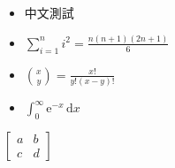 \begin{itemize}

\item 中文測試 

\item $\sum \limits_{i=1}^n i^2 = \frac{n(n+1)(2n+1)}{6}$

\item $ \binom{x}{y} = \frac{x!}{y!(x-y)!}$

\item $ {\int_0^\infty \mathrm{e}^{-x}\,\mathrm{d}x}$

\end{itemize}

\item $ {\begin{bmatrix}a & b \\c & d \end{bmatrix}}$